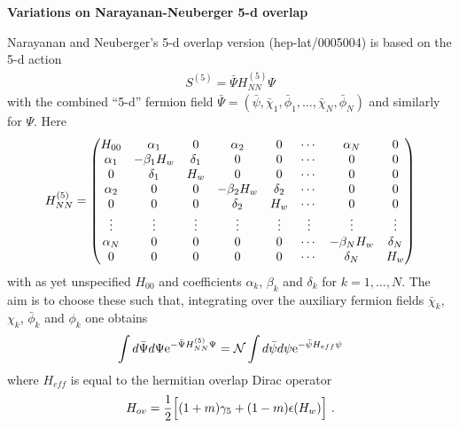 \documentclass[12pt]{article}
\begin{document}
\def\dirac{{\bf \rm D}\!\!\!\!/\,}
\newcommand{\half}{\frac{1}{2}}
\newcommand{\be}{\begin{displaymath}}
\newcommand{\ee}{\end{displaymath}}
\newcommand{\bea}{\begin{eqnarray}}
\newcommand{\eea}{\end{eqnarray}}
\newcommand{\bdm}{\begin{displaymath}}
\newcommand{\edm}{\end{displaymath}}
\newcommand{\<}{\langle}
\renewcommand{\>}{\rangle}
\newcommand{\Tr}{\mbox{Tr}}

\centerline{\bf \Large Variations on Narayanan-Neuberger 5-d overlap}
\vskip 5mm

Narayanan and Neuberger's 5-d overlap version (hep-lat/0005004) is based
on the 5-d action
\bea
S^{(5)} = \bar \Psi H^{(5)}_{NN} \Psi
\eea
with the combined ``5-d'' fermion field $\bar \Psi = (\bar \psi, \bar \chi_1,
\bar \phi_1, \dots, \bar \chi_N, \bar \phi_N)$ and similarly for $\Psi$.
Here
\bea
H^{(5)}_{NN} = \begin{pmatrix}
H_{00} & \alpha_1 & 0 & \alpha_2 & 0 & \cdots & \alpha_N & 0 \cr
\alpha_1 & -\beta_1 H_w & \delta_1 & 0 & 0 & \cdots & 0 & 0 \cr
0 & \delta_1 & H_w & 0 & 0 & \cdots & 0 & 0 \cr
\alpha_2 & 0 & 0 & -\beta_2 H_w & \delta_2 & \cdots & 0 & 0 \cr
0 & 0 & 0 & \delta_2 & H_w & \cdots & 0 & 0 \cr
\vdots & \vdots & \vdots & \vdots & \vdots & \vdots & \vdots & \vdots \cr
\alpha_N & 0 & 0 & 0 & 0 & \cdots & -\beta_N H_w & \delta_N \cr
0 & 0 & 0 & 0 & 0 & \cdots & \delta_N & H_w \cr
\end{pmatrix}
\label{eq:H_5d_matrix}
\eea
with as yet unspecified $H_{00}$ and coefficients $\alpha_k$, $\beta_k$
and $\delta_k$ for $k=1, \dots, N$.
The aim is to choose these such that, integrating over the auxiliary
fermion fields $\bar \chi_k$, $\chi_k$, $\bar \phi_k$ and $\phi_k$
one obtains
\bea
\int d \bar \Psi d \Psi {\rm e}^{- \bar \Psi H^{(5)}_{NN} \Psi} =
{\cal N} \int d \bar \psi d \psi {\rm e}^{- \bar \psi H_{eff} \psi}
\eea
where $H_{eff}$ is equal to the hermitian overlap Dirac operator
\bea
H_{ov} = \frac{1}{2} \Bigl[ (1+m) \gamma_5 + (1-m) \epsilon(H_w) \Bigr] ~.
\label{eq:H_ov}
\eea
\end{document}

